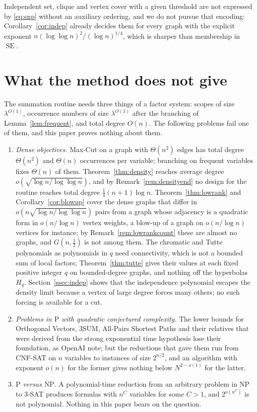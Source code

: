 \documentclass[11pt,reqno]{amsart}
\numberwithin{equation}{section}
\theoremstyle{plain}
\theoremstyle{definition}
\theoremstyle{remark}
\DeclareMathOperator{\SE}{SE}
\newcommand{\oai}{OpenAI}
\begin{document}
Independent set, clique and vertex cover with a given threshold are not
expressed by \eqref{eq:snp} without an auxiliary ordering, and we do not pursue
that encoding: Corollary~\ref{cor:indep} already decides them for every graph
with the explicit exponent $n(\log\log n)^2/(\log n)^{1/4}$, which is sharper
than membership in $\SE$.

\section{What the method does not give}\label{sec:scope}

The summation routine needs three things of a factor system: scopes of size
$\lambda^{O(1)}$, occurrence numbers of size $\lambda^{O(1)}$ after the
branching of Lemma~\ref{lem:frequent}, and total degree $O(n)$. The following
problems fail one of them, and this paper proves nothing about them.

\begin{enumerate}[label=(\alph*),leftmargin=2.2em]
\item \emph{Dense objectives.} Max-Cut on a graph with $\Theta(n^2)$ edges has
total degree $\Theta(n^2)$ and $\Theta(n)$ occurrences per variable; branching
on frequent variables fixes $\Theta(n)$ of them. Theorem~\ref{thm:density}
reaches average degree $o(\sqrt{\log n/\log\log n})$, and by
Remark~\ref{rem:densityend} no design for the routine reaches total degree
$\frac14(n+1)\log n$. Theorem~\ref{thm:lowrank} and Corollary~\ref{cor:blowup} cover the dense graphs
that differ in $o(n\sqrt{\log n/\log\log n})$ pairs from a graph whose adjacency is
a quadratic form in $o(n/\log n)$ vertex weights, a blow-up of a graph on
$o(n/\log n)$ vertices for instance; by Remark~\ref{rem:lowrankcount} these are
almost no graphs, and $G(n,\frac12)$ is not among them. The
chromatic and Tutte polynomials as polynomials in $q$ need connectivity, which
is not a bounded sum of local factors; Theorem~\ref{thm:tutte} gives their
values at each fixed positive integer $q$ on bounded-degree graphs, and nothing
off the hyperbolas $H_q$. Section~\ref{ssec:indep} shows that the independence
polynomial escapes the density limit because a vertex of large degree forces
many others; no such forcing is available for a cut.
\item \emph{Problems in $\mathrm{P}$ with quadratic conjectured complexity.}
The lower bounds for Orthogonal Vectors, $3$SUM, All-Pairs Shortest Paths and
their relatives that were derived from the strong exponential time hypothesis
lose their foundation, as \oai{} note; but the reductions that gave them run
from CNF-SAT on $n$ variables to instances of size $2^{n/2}$, and an algorithm
with exponent $o(n)$ for the former gives nothing below $N^{2-o(1)}$ for the
latter.
\item \emph{$\mathrm{P}$ versus $\mathrm{NP}$.} A polynomial-time reduction
from an arbitrary problem in $\mathrm{NP}$ to $3$-SAT produces formulas with
$n^{C}$ variables for some $C>1$, and $2^{o(n^{C})}$ is not polynomial.
Nothing in this paper bears on the question.
\end{enumerate}
\end{document}
